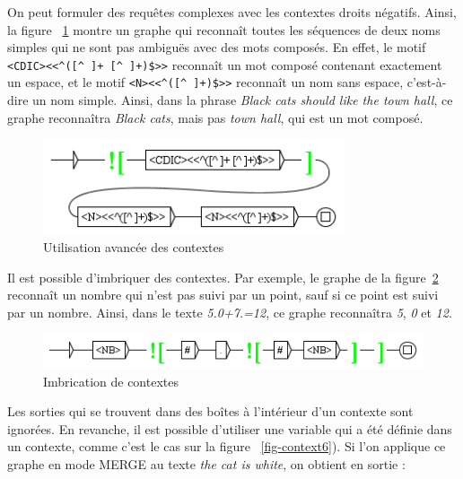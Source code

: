 \bigskip
\noindent On peut formuler des requêtes complexes avec les contextes droits négatifs. Ainsi, la figure
~\ref{fig-context4} montre un graphe qui reconnaît toutes les séquences de deux noms simples qui ne
sont pas ambiguës avec des mots composés. En effet, le motif \verb?<CDIC><<^([^ ]+ [^ ]+)$>>? 
reconnaît un mot composé contenant exactement un espace, et le motif \verb?<N><<^([^ ]+)$>>?
reconnaît un nom sans espace, c’est-à-dire un nom simple. Ainsi,
 dans la phrase \textit{Black cats should like the town hall}, ce graphe reconnaîtra
 \textit{Black cats}, mais pas \textit{town hall}, qui est un mot composé.

\bigskip
\begin{figure}[!ht]
\begin{center}
\includegraphics[width=8.9cm]{resources/img/fig6-15.png}
\caption{Utilisation avancée des contextes\label{fig-context4}}
\end{center}
\end{figure}

\bigskip
\noindent Il est possible d’imbriquer des contextes. Par exemple, le graphe de la
figure~\ref{fig-context5}
reconnaît un nombre qui n’est pas suivi par un point, sauf si ce point est suivi par un nombre.
Ainsi, dans le texte \textit{5.0+7.=12}, ce graphe reconnaîtra \textit{5}, \textit{0} et
\textit{12}.

\bigskip
\begin{figure}[!ht]
\begin{center}
\includegraphics[width=12cm]{resources/img/fig6-16.png}
\caption{Imbrication de contextes\label{fig-context5}}
\end{center}
\end{figure}

\bigskip
\noindent Les sorties qui se trouvent dans des boîtes à l’intérieur d’un contexte sont ignorées.
En revanche, il est possible d’utiliser une variable qui a été définie dans un contexte, comme
c’est le cas sur la figure ~\ref{fig-context6}). Si l’on applique ce graphe en mode MERGE au texte
\textit{the cat is white}, on obtient en sortie :

